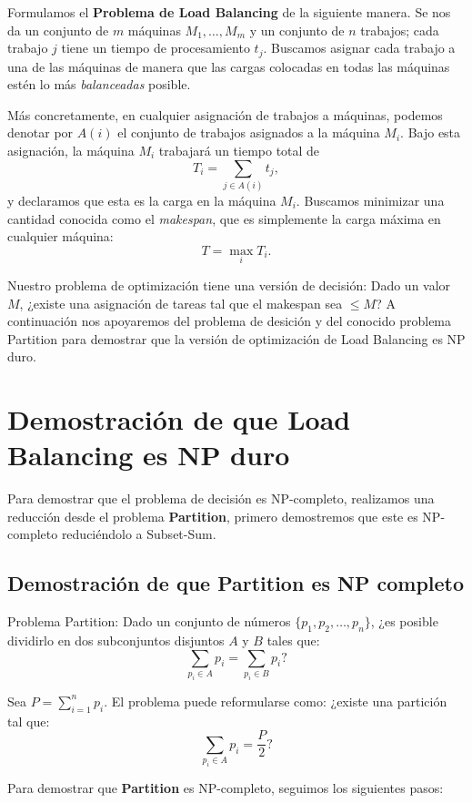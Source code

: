 \documentclass{report}
\begin{document}
	Formulamos el \textbf{Problema de Load Balancing} de la siguiente manera. Se nos da un conjunto de \( m \) máquinas \( M_1, \dots, M_m \) y un conjunto de \( n \) trabajos; cada trabajo \( j \) tiene un tiempo de procesamiento \( t_j \). Buscamos asignar cada trabajo a una de las máquinas de manera que las cargas colocadas en todas las máquinas estén lo más \textit{balanceadas} posible.
	
	Más concretamente, en cualquier asignación de trabajos a máquinas, podemos denotar por \( A(i) \) el conjunto de trabajos asignados a la máquina \( M_i \). Bajo esta asignación, la máquina \( M_i \) trabajará un tiempo total de
	\[
	T_i = \sum_{j \in A(i)} t_j,
	\]
	y declaramos que esta es la carga en la máquina \( M_i \). Buscamos minimizar una cantidad conocida como el \textit{makespan}, que es simplemente la carga máxima en cualquier máquina:
	\[
	T = \max_i T_i.
	\]
	


	Nuestro problema de optimización tiene una versión de decisión: Dado un valor $ M $, ¿existe una asignación de tareas tal que el makespan sea $ \leq M $?
	A continuación nos apoyaremos del problema de desición y del conocido problema Partition para demostrar que la versión de optimización de Load Balancing es NP duro.
	
	\section{Demostración de que Load Balancing es NP duro}
	
		
	Para demostrar que el problema de decisión es NP-completo, realizamos una reducción desde el problema \textbf{Partition}, primero demostremos que este es NP-completo reduciéndolo a Subset-Sum.
	
	\subsection{Demostración de que Partition es NP completo}
	
	Problema Partition:	Dado un conjunto de números $ \{p_1, p_2, \dots, p_n\} $, ¿es posible dividirlo en dos subconjuntos disjuntos $ A $ y $ B $ tales que:
	\[
	\sum_{p_i \in A} p_i = \sum_{p_i \in B} p_i?
	\]
	
	Sea $ P = \sum_{i=1}^n p_i $. El problema puede reformularse como: ¿existe una partición tal que:
	\[
	\sum_{p_i \in A} p_i = \frac{P}{2}?
	\]
	
	
	Para demostrar que \textbf{Partition} es NP-completo, seguimos los siguientes pasos:
	
\end{document}
